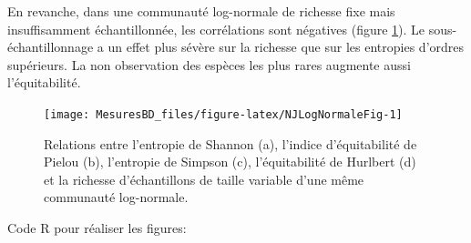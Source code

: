 \documentclass[
  11pt,
  french,
  a4paper,
  extrafontsizes,onecolumn,openright
  ]{memoir}
\begin{document}
\normalsize

En revanche, dans une communauté log-normale de richesse fixe mais insuffisamment échantillonnée, les corrélations sont négatives (figure \ref{fig:NJLogNormaleFig}).
Le sous-échantillonnage a un effet plus sévère sur la richesse que sur les entropies d'ordres supérieurs.
La non observation des espèces les plus rares augmente aussi l'équitabilité.



\scriptsize

\begin{figure}

{\centering \texttt{[image: MesuresBD\_files/figure-latex/NJLogNormaleFig-1]} 

}

\caption{Relations entre l'entropie de Shannon (a), l'indice d'équitabilité de Pielou (b), l'entropie de Simpson (c), l'équitabilité de Hurlbert (d) et la richesse d'échantillons de taille variable d'une même communauté log-normale.}\label{fig:NJLogNormaleFig}
\end{figure}

\normalsize

Code R pour réaliser les figures:

\scriptsize
\end{document}
